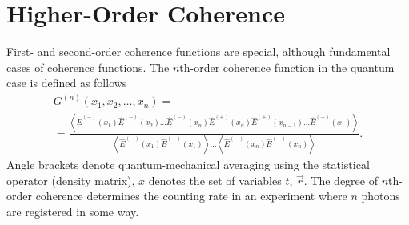 \section{Higher-Order Coherence}
First- and second-order coherence functions are special,
although fundamental cases of coherence functions. The
$n$th-order coherence function in the quantum case is defined
as follows 
\begin{eqnarray}
G^{(n)}\left(x_1, x_2, \dots , x_n\right) =  
\nonumber \\
=
\frac{\left<
\hat{E}^{(-)}\left(x_1\right)
\hat{E}^{(-)}\left(x_2\right)
\dots
\hat{E}^{(-)}\left(x_n\right)
\hat{E}^{(+)}\left(x_{n}\right)
\hat{E}^{(+)}\left(x_{n - 1} \right)
\dots
\hat{E}^{(+)}\left(x_{1}\right)
\right>}
{
\left<
\hat{E}^{(-)}\left(x_1\right)
\hat{E}^{(+)}\left(x_1\right)
\right>
\dotsc
\left<
\hat{E}^{(-)}\left(x_{n}\right)
\hat{E}^{(+)}\left(x_{n}\right)
\right>
}.
\label{eqCh4_39}
\end{eqnarray}
Angle brackets denote quantum-mechanical averaging using
the statistical operator (density matrix), $x$ denotes the set
of variables $t$, $\vec{r}$. The degree of $n$th-order coherence
determines the counting rate in an experiment where $n$ photons
are registered in some way. 
